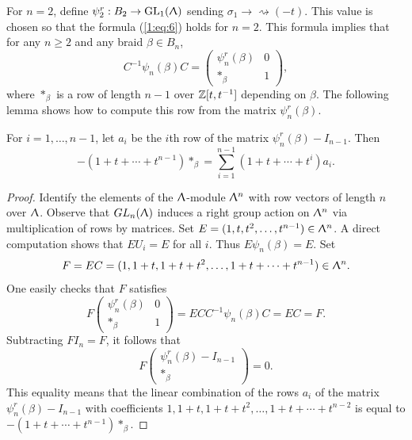 For $n=2$, define $\psi^r_2 : B_2 \to \text{GL}_1(\Uplambda)$ sending $\sigma_1 \to \rightsquigarrow (-t)$. This value is chosen so that the formula (\ref{1:eq:6}) holds for $n=2$. This formula implies that for any $n\geq 2$ and any braid $\beta \in B_n$, 
\begin{equation}
\label{1:eq:5}
C^{-1} \psi_n(\beta) C = \begin{pmatrix} \psi_n^r(\beta) & 0 \\ *_{\beta} & 1 \end{pmatrix},
\end{equation}
where $*_{\beta}$ is a row of length $n-1$ over $\mathbb{Z}[t, t^{-1}]$ depending on $\beta$. The following lemma shows how to compute this row from the matrix $\psi_n^r(\beta)$.

\begin{lemma}
\label{sec:burau-representation-3}
For $i =1, \ldots, n-1$, let $a_i$ be the $i$th row of the matrix $\psi_n^r(\beta ) - I_{n-1}$. Then 
\begin{displaymath}
-(1 + t + \cdots + t^{n-1})*_{\beta} = \sum_{i=1}^{n-1} (1+ t + \cdots + t^i)a_i.
\end{displaymath}
\end{lemma}

\begin{proof}
\label{sec:burau-representation-4}
Identify the elements of the $\Uplambda$-module $\Uplambda^n$ with row vectors of length $n$ over $\Uplambda$. Observe that $GL_n(\Uplambda)$ induces a right group action on $\Uplambda^n$ via multiplication of rows by matrices. Set $E = (1, t, t^2, \ldots, t^{n-1}) \in \Uplambda^n$. A direct computation shows that $EU_i = E$ for all $i$. Thus $E\psi_n(\beta) = E$. Set 
\begin{displaymath}
F = EC = (1, 1 + t, 1 + t + t^2, \ldots, 1 + t + \cdots + t^{n-1}) \in \Uplambda^n.
\end{displaymath}
One easily checks that $F$ satisfies
\begin{displaymath}
F \begin{pmatrix} \psi_n^r(\beta) & 0 \\ *_{\beta} & 1 \end{pmatrix} = ECC^{-1}\psi_n(\beta) C = EC = F.
\end{displaymath}
Subtracting $FI_n = F$, it follows that 
\begin{displaymath}
F \begin{pmatrix} \psi_n^r(\beta) - I_{n-1} \\ *_{\beta} \end{pmatrix} = 0.
\end{displaymath}
This equality means that the linear combination of the rows $a_i$ of the matrix $\psi_n^r(\beta) - I_{n-1}$ with coefficients $1, 1+t, 1 + t + t^2, \ldots, 1 + t + \cdots + t^{n-2}$ is equal to $-(1 + t + \cdots + t^{n-1})*_{\beta}$.
\end{proof}

